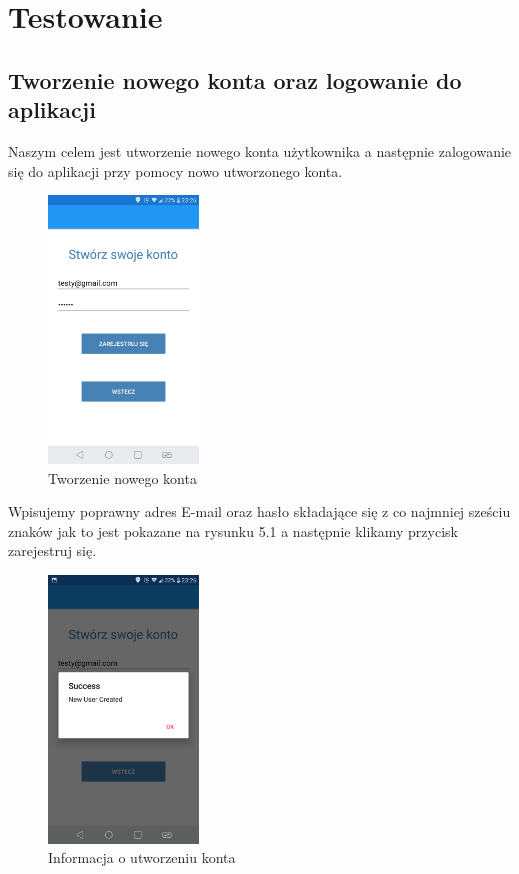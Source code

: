 	\newpage
\section{Testowanie}	%
\subsection{Tworzenie nowego konta oraz logowanie do aplikacji}

\hspace{1cm} Naszym celem jest utworzenie nowego konta użytkownika a następnie zalogowanie się do aplikacji przy pomocy nowo utworzonego konta.

\begin{figure}[!htb]
	\begin{center}
		\includegraphics[width=4cm]{rys/ZZkonto.png}
		\caption{Tworzenie nowego konta}
		\label{rys:rysunek029}
	\end{center}
\end{figure}

Wpisujemy poprawny adres E-mail oraz hasło składające się z co najmniej sześciu znaków jak to jest pokazane na rysunku 5.1 a następnie klikamy przycisk zarejestruj się.

\begin{figure}[!htb]
	\begin{center}
		\includegraphics[width=4cm]{rys/ZZkonto2.png}
		\caption{Informacja o utworzeniu konta}
		\label{rys:rysunek030}
	\end{center}
\end{figure}

